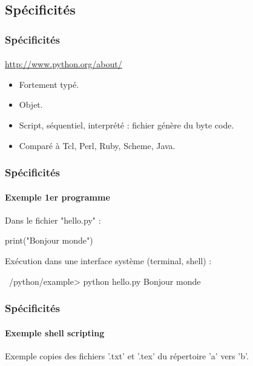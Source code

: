 \subsection{Spécificités}
\begin{frame}
\frametitle{Spécificités}
\framesubtitle{}
\url{http://www.python.org/about/}
\begin{itemize}
 \item Fortement typé.  
 \item Objet.
 \item Script, séquentiel, interprété : fichier génère du byte code.
 \item Comparé à Tcl, Perl, Ruby, Scheme, Java.
\end{itemize}
\end{frame}
\begin{frame}[fragile]
\frametitle{Spécificités}
\framesubtitle{Exemple 1er programme}
Dans le fichier "hello.py" : 
\begin{python}
print("Bonjour monde")
\end{python}

Exécution dans une interface système (terminal, shell) : 
\begin{shell}
~/python/example> python hello.py
Bonjour monde
\end{shell}
\end{frame}
\begin{frame}[fragile]
\frametitle{Spécificités}
\framesubtitle{Exemple shell scripting}
Exemple copies des fichiers '.txt' et '.tex' du répertoire 'a' vers 'b'.

\end{frame}

